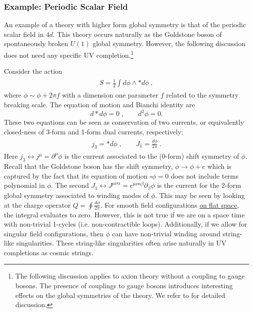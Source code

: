 \documentclass[11pt]{article}
\newcommand{\eq}[1]{\begin{align}\begin{split}#1\end{split}\end{align}}
\def\half{\frac{1}{2}}
\def\beq{\begin{equation}}
\def\eeq{\end{equation}}
\begin{document}
\subsubsection{Example: Periodic Scalar Field}
\label{periodicscalar}

An example of a theory with higher form global symmetry is that of the periodic scalar field in $4d$. This theory occurs naturally as the Goldstone boson of spontaneously broken $U(1)$ global symmetry. However, the following discussion does not need any specific UV completion.\footnote{The following discussion applies to axion theory without a coupling to gauge bosons. The presence of couplings to gauge bosons introduces interesting effects on the global symmetries of the theory. We refer to \cite{Hidaka:2020iaz,Hidaka:2020izy,Brennan:2020ehu,Brennan:2023kpw} for detailed discussion.}

Consider the action 
\eq{
S=\half\int  d\phi \wedge \ast d\phi~,
}
where $\phi\sim \phi+2\pi f$ with a dimension one parameter $f$ related to the symmetry breaking scale. 
The equation of motion and Bianchi identity are 
%
\beq
d \ast  d \phi = 0 \;, \quad \quad d^2 \phi = 0.
\eeq
%
These two equations can be seen as conservation of two currents, or equivalently closed-ness of 3-form and 1-form dual currents, respectively:
%
\eq{
j_3=\ast d \phi \; ,\quad \quad J_1=\frac{d\phi}{2\pi}~.
} 
Here $j_3\leftrightarrow j^\mu=\partial^\mu\phi$ is the current associated to the (0-form) shift symmetry of $\phi$. Recall that the Goldstone boson has the shift symmetry, $\phi \to \phi + c$ which is captured by the fact that its equation of motion $\square \phi = 0$ does not include terms polynomial in $\phi$. 
The second $J_1\leftrightarrow J^{\mu\nu\alpha}=\epsilon^{\mu\nu\alpha\beta}\partial_\beta\phi $ is the current for the 2-form global symmetry associated to winding modes of $\phi$. This may be seen by looking at the charge operator $Q = \oint \frac{d \phi}{2\pi}$. For smooth field configurations \underline{on flat space}, the integral evaluates to zero. 
However, this is not true if we are on a space time with non-trivial 1-cycles (i.e. non-contractible loops). Additionally, if we allow for singular field configurations, then $\phi$ can have non-trivial winding around string-like singularities. These string-like singularities often arise naturally in UV completions as cosmic strings.  
\end{document}

